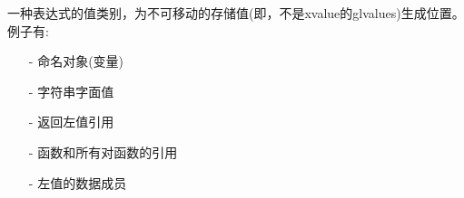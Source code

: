 


一种表达式的值类别，为不可移动的存储值(即，不是xvalue的glvalues)生成位置。例子有:

\begin{itemize}
\item [-]
命名对象(变量)

\item [-]
字符串字面值

\item [-]
返回左值引用

\item [-]
函数和所有对函数的引用

\item [-]
左值的数据成员
\end{itemize}

